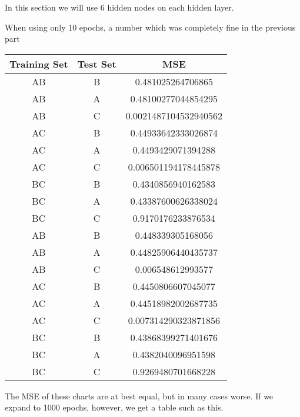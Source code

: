 \documentclass[12pt]{article}
\begin{document}
In this section we will use 6 hidden nodes on each hidden layer.

When using only 10 epochs, a number which was completely fine in the previous part 

\begin{tabular}{|c|c|c|}
\hline
Training Set & Test Set & MSE \\ \hline
AB & B & 0.481025264706865 \\
AB & A & 0.48100277044854295 \\
AB & C & 0.0021487104532940562 \\
\hline
AC & B & 0.44933642333026874 \\
AC & A & 0.4493429071394288 \\
AC & C & 0.006501194178445878 \\
\hline
BC & B & 0.4340856940162583 \\
BC & A & 0.43387600626338024 \\
BC & C & 0.9170176233876534 \\
\hline
AB & B & 0.448339305168056 \\
AB & A & 0.44825906440435737 \\
AB & C & 0.006548612993577 \\
\hline
AC & B & 0.4450806607045077 \\
AC & A & 0.44518982002687735 \\
AC & C & 0.007314290323871856 \\
\hline
BC & B & 0.43868399271401676 \\
BC & A & 0.4382040096951598 \\
BC & C & 0.9269480701668228 \\
\hline
\end{tabular}

The MSE of these charts are at best equal, but in many cases worse. If we expand to 1000 epochs, however, we get a table such as this.
\end{document}
